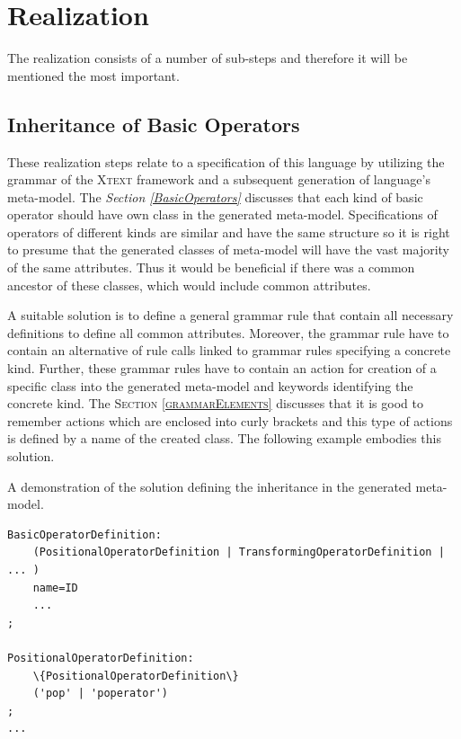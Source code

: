 \documentclass[12pt,notitlepage,a4paper]{report}
\begin{document}
\section{Realization}

The realization consists of a number of sub-steps and therefore it will be mentioned the most important.

\subsection{Inheritance of Basic Operators}
These realization steps relate to a specification of this language by utilizing the grammar of the \textsc{Xtext} framework and a subsequent generation of language's meta-model. The \textit{Section \ref{BasicOperators}} discusses that each kind of basic operator should have own class in the generated meta-model. Specifications of operators of different kinds are similar and have the same structure so it is right to presume that the generated classes of meta-model will have the vast majority of the same attributes. Thus it would be beneficial if there was a common ancestor of these classes, which would include common attributes.

A suitable solution is to define a general grammar rule that contain all necessary definitions to define all common attributes. Moreover, the grammar rule have to contain an alternative of rule calls linked to grammar rules specifying a concrete kind. Further, these grammar rules have to contain an action for creation of a specific class into the generated meta-model and keywords identifying the concrete kind. The \textsc{Section \ref{grammarElements}} discusses that it is good to remember  actions which are enclosed into curly brackets and this type of actions is defined by a name of the created class. The following example embodies this solution.

\begin{expl}\label{Inheritance}
A demonstration of the solution defining the inheritance in the generated meta-model.
\begingroup
\fontsize{10pt}{12pt}
\begin{Verbatim}[commandchars=\\\{\}]
BasicOperatorDefinition:
    (PositionalOperatorDefinition | TransformingOperatorDefinition | ... )
    name=ID
    ...
;

PositionalOperatorDefinition:
	\{PositionalOperatorDefinition\}
	('pop' | 'poperator') 
;
...
\end{Verbatim}
\endgroup
\end{expl}
\end{document}
